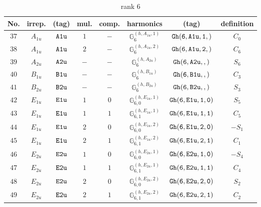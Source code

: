 \documentclass[fleqn,8pt]{jsarticle}
\begin{document}
\begin{table}[ht!]
\begin{center}
\caption{rank 6}
\renewcommand{\arraystretch}{1.3}
\begin{tabular}{cccccccc} \hline \hline
No. & irrep. & (tag) & mul. & comp. & harmonics & (tag) & definition \\ \hline
$ 37 $ & $ A_{1u} $ & $ {\tt A1u} $ & $ 1 $ & $ - $ & $ \mathbb{G}_{6}^{(h,A_{1u},1)} $ & $ {\tt Gh(6,A1u,1,)} $ & $ C_{0} $ \\
$ 38 $ & $ A_{1u} $ & $ {\tt A1u} $ & $ 2 $ & $ - $ & $ \mathbb{G}_{6}^{(h,A_{1u},2)} $ & $ {\tt Gh(6,A1u,2,)} $ & $ C_{6} $ \\
$ 39 $ & $ A_{2u} $ & $ {\tt A2u} $ & $ - $ & $ - $ & $ \mathbb{G}_{6}^{(h,A_{2u})} $ & $ {\tt Gh(6,A2u,,)} $ & $ S_{6} $ \\
$ 40 $ & $ B_{1u} $ & $ {\tt B1u} $ & $ - $ & $ - $ & $ \mathbb{G}_{6}^{(h,B_{1u})} $ & $ {\tt Gh(6,B1u,,)} $ & $ C_{3} $ \\
$ 41 $ & $ B_{2u} $ & $ {\tt B2u} $ & $ - $ & $ - $ & $ \mathbb{G}_{6}^{(h,B_{2u})} $ & $ {\tt Gh(6,B2u,,)} $ & $ S_{3} $ \\
$ 42 $ & $ E_{1u} $ & $ {\tt E1u} $ & $ 1 $ & $ 0 $ & $ \mathbb{G}_{6,0}^{(h,E_{1u},1)} $ & $ {\tt Gh(6,E1u,1,0)} $ & $ S_{5} $ \\
$ 43 $ & $ E_{1u} $ & $ {\tt E1u} $ & $ 1 $ & $ 1 $ & $ \mathbb{G}_{6,1}^{(h,E_{1u},1)} $ & $ {\tt Gh(6,E1u,1,1)} $ & $ C_{5} $ \\
$ 44 $ & $ E_{1u} $ & $ {\tt E1u} $ & $ 2 $ & $ 0 $ & $ \mathbb{G}_{6,0}^{(h,E_{1u},2)} $ & $ {\tt Gh(6,E1u,2,0)} $ & $ - S_{1} $ \\
$ 45 $ & $ E_{1u} $ & $ {\tt E1u} $ & $ 2 $ & $ 1 $ & $ \mathbb{G}_{6,1}^{(h,E_{1u},2)} $ & $ {\tt Gh(6,E1u,2,1)} $ & $ C_{1} $ \\
$ 46 $ & $ E_{2u} $ & $ {\tt E2u} $ & $ 1 $ & $ 0 $ & $ \mathbb{G}_{6,0}^{(h,E_{2u},1)} $ & $ {\tt Gh(6,E2u,1,0)} $ & $ - S_{4} $ \\
$ 47 $ & $ E_{2u} $ & $ {\tt E2u} $ & $ 1 $ & $ 1 $ & $ \mathbb{G}_{6,1}^{(h,E_{2u},1)} $ & $ {\tt Gh(6,E2u,1,1)} $ & $ C_{4} $ \\
$ 48 $ & $ E_{2u} $ & $ {\tt E2u} $ & $ 2 $ & $ 0 $ & $ \mathbb{G}_{6,0}^{(h,E_{2u},2)} $ & $ {\tt Gh(6,E2u,2,0)} $ & $ S_{2} $ \\
$ 49 $ & $ E_{2u} $ & $ {\tt E2u} $ & $ 2 $ & $ 1 $ & $ \mathbb{G}_{6,1}^{(h,E_{2u},2)} $ & $ {\tt Gh(6,E2u,2,1)} $ & $ C_{2} $ \\
 \hline \hline
\end{tabular}
\end{center}
\end{table}
\end{document}
